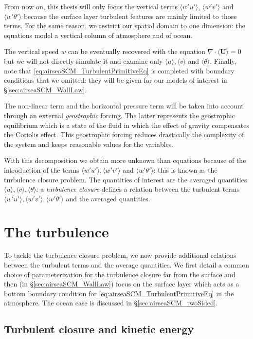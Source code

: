 From now on, this thesis will only focus the vertical terms
$\langle w' u'\rangle$, $\langle w' v'\rangle$ and
$\langle w' \theta'\rangle$
because the surface layer turbulent features are mainly limited
to those terms. For the same reason, we restrict our spatial
domain to one dimension: the equations model a vertical column
of atmosphere and of ocean.
\par
The vertical speed $w$ can be eventually recovered with the
equation $\nabla \cdot \langle\mathbf{U}\rangle = 0$
but we will not directly simulate it and examine only
$\langle u \rangle, \langle v \rangle$ and $\langle \theta \rangle$.
Finally, note that \eqref{eq:airseaSCM_TurbulentPrimitiveEq}
is completed with boundary conditions that we omitted:
they will be given for our models of interest in
\S\ref{sec:airseaSCM_WallLaw}.
\par
The non-linear term and the horizontal pressure term
will be taken into account through an external \textit{geostrophic}
forcing. The latter represents the geostrophic equilibrium which
is a state of the fluid in which the effect of gravity compensates
the Coriolis effect. This geostrophic forcing reduces
drastically the complexity of the system and keeps
reasonable values
for the variables.
\par
With this decomposition we obtain more unknown than
equations because of the introduction of the terms
$\langle w' u'\rangle, \langle w' v'\rangle$
and $\langle w' \theta'\rangle$:
this is known as the turbulence closure problem.
The quantities of interest are the averaged quantities
$\langle u\rangle, \langle v\rangle, \langle \theta \rangle$:
a \textit{turbulence closure} defines a relation between
the turbulent terms $\langle w' u'\rangle, \langle w' v'\rangle,
\langle w' \theta'\rangle$ and the averaged quantities.
\section{The turbulence}
\label{sec:airseaSCM_turbulence}
To tackle the turbulence closure problem,
we now provide additional relations between
the turbulent terms and the average quantities.
We first detail a common choice of parameterization
for the turbulence closure far from the surface and then
(in \S\ref{sec:airseaSCM_WallLaw}) focus on the surface layer
which acts as a bottom boundary condition for
\eqref{eq:airseaSCM_TurbulentPrimitiveEq} in the atmosphere.
The ocean case is discussed in \S\ref{sec:airseaSCM_twoSided}.
\subsection{Turbulent closure and kinetic energy}
\label{sec:airseaSCM_turbulentClosure}
